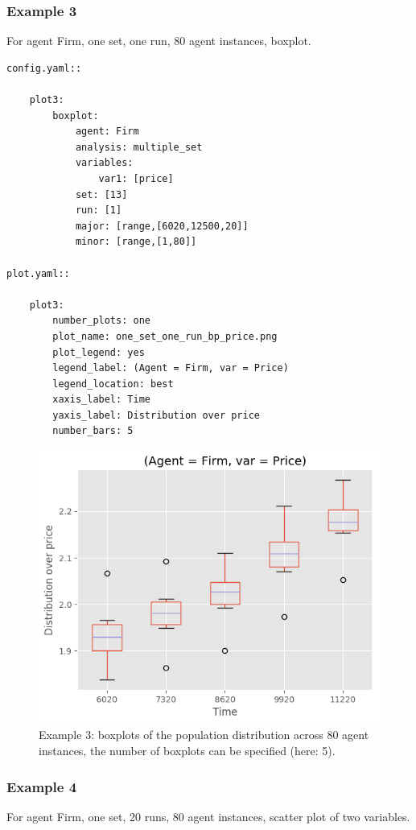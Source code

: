 \documentclass[10pt,a4paper]{article}
\begin{document}
\clearpage
\subsubsection{Example 3}
 For agent Firm, one set, one run, 80 agent instances, boxplot.

\begin{lstlisting}
config.yaml::

    plot3:
        boxplot:
            agent: Firm
            analysis: multiple_set
            variables:
                var1: [price]
            set: [13]
            run: [1]
            major: [range,[6020,12500,20]]
            minor: [range,[1,80]]

plot.yaml::

    plot3:
        number_plots: one
        plot_name: one_set_one_run_bp_price.png
        plot_legend: yes
        legend_label: (Agent = Firm, var = Price)
        legend_location: best
        xaxis_label: Time
        yaxis_label: Distribution over price
        number_bars: 5
\end{lstlisting}

\begin{figure}[b!]\centering\leavevmode
\includegraphics[scale=.7]{./plots_tut_2/one_set_one_run_bp_price_price.png}
\caption{\footnotesize  Example 3: boxplots of the population distribution across 80 agent instances, the number of boxplots can be specified (here: 5).}
\end{figure}

\clearpage
\subsubsection{Example 4}
For agent Firm, one set, 20 runs, 80 agent instances, scatter plot of two variables.
\end{document}
